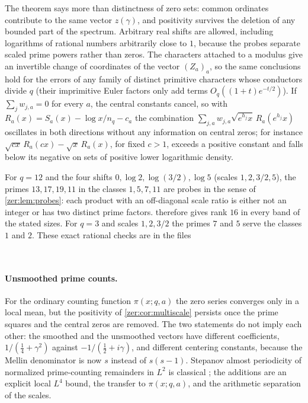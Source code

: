 The theorem says more than distinctness of zero sets: common ordinates contribute to the
same vector $z(\gamma)$, and positivity survives the deletion of any bounded part of the
spectrum. Arbitrary real shifts are allowed, including logarithms of rational numbers
arbitrarily close to $1$, because the probes separate scaled prime powers rather than zeros.
The characters attached to a modulus give an invertible change of coordinates of the vector
$(Z_a)_a$, so the same conclusions hold for the errors of any family of distinct primitive
characters whose conductors divide $q$ (their imprimitive Euler factors only add terms
$O_q((1+t)e^{-t/2})$). If $\sum_jw_{j,a}=0$ for every $a$, the central constants cancel, so
with $R_a(x)=S_a(x)-\log x/n_q-c_a$ the combination
$\sum_{j,a}w_{j,a}\sqrt{e^{h_j}x}\,R_a(e^{h_j}x)$ oscillates in both directions without any
information on central zeros; for instance $\sqrt{cx}\,R_a(cx)-\sqrt x\,R_a(x)$, for fixed
$c>1$, exceeds a positive constant and falls below its negative on sets of positive lower
logarithmic density.

\begin{example}\label{zer:ex:probes}
For $q=12$ and the four shifts $0,\log2,\log(3/2),\log5$ (scales $1,2,3/2,5$), the primes
$13,17,19,11$ in the classes $1,5,7,11$ are probes in the sense of \cref{zer:lem:probes}: each
product with an off-diagonal scale ratio is either not an integer or has two distinct prime
factors.  therefore gives rank $16$ in every band of the stated sizes.
For $q=3$ and scales $1,2,3/2$ the primes $7$ and $5$ serve the classes $1$ and $2$. These
exact rational checks are in the files
\begin{center}
\\
\end{center}
\end{example}

\paragraph{Unsmoothed prime counts.}
For the ordinary counting function $\pi(x;q,a)$ the zero series converges only in a local mean, but
the positivity of \cref{zer:cor:multiscale} persists once the prime squares and the central zeros are
removed. The two statements do not imply each other: the smoothed and the unsmoothed vectors have
different coefficients, $1/(\tfrac14+\gamma^2)$ against $-1/(\tfrac12+i\gamma)$, and different
centering constants, because the Mellin denominator is now $s$ instead of $s(s-1)$. Stepanov almost
periodicity of normalized prime-counting remainders in $L^2$ is classical
\cite[Theorem~1(e)]{KaczorowskiRamare2003Almost}; the additions are an explicit local $L^4$ bound, the
transfer to $\pi(x;q,a)$, and the arithmetic separation of the scales.

